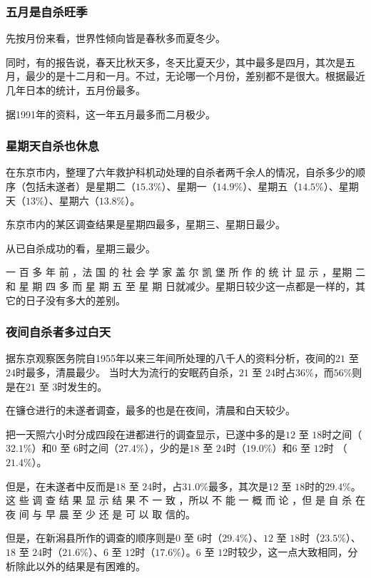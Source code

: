 \documentclass[UTF8]{ctexart}
\begin{document}
\subsubsection*{五月是自杀旺季}

先按月份来看，世界性倾向皆是春秋多而夏冬少。

同时，有的报告说，春天比秋天多，冬天比夏天少，其中最多是四月，其次是五月，最少的是十二月和一月。不过，无论哪一个月份，差别都不是很大。根据最近几年日本的统计，五月份最多。

据1991年的资料，这一年五月最多而二月极少。

\subsubsection*{星期天自杀也休息}

在东京市内，整理了六年救护科机动处理的自杀者两千余人的情况，自杀多少的顺序（包括未遂者）是星期二（$15.3\%$）、星期一（$14.9\%$）、星期五（$14.5\%$）、星期天（$13\%$）、星期六（$13.8\%$）。

东京市内的某区调查结果是星期四最多，星期三、星期日最少。

从已自杀成功的看，星期三最少。

一 百 多 年 前 ，法 国 的 社 会 学 家 盖 尔 凯 堡 所 作 的 统 计 显 示 ，星期 二 和 星 期 四 多 而 星 期 五 至 星 期 日就减少。星期日较少这一点都是一样的，其它的日子没有多大的差别。

\subsubsection*{夜间自杀者多过白天}

据东京观察医务院自1955年以来三年间所处理的八千人的资料分析，夜间的$21$ 至 $24$时最多，清晨最少。
当时大为流行的安眠药自杀，$21$ 至 $24$时占$36\%$，而$56\%$则是在$21$ 至 $3$时发生的。

在镰仓进行的未遂者调查，最多的也是在夜间，清晨和白天较少。

把一天照六小时分成四段在进都进行的调查显示，已遂中多的是$12$ 至 $18$时之间（$32.1\%$）和$0$ 至 $6$时之间（$27.4\%$），少的是$18$ 至 $24$时（$19.0\%$）和$6$ 至 $12$时 （$21.4\%$）。

但是，在未遂者中反而是$18$ 至 $24$时，占$31.0\%$最多，其次是$12$ 至 $18$时的$29.4\%$。 这 些 调 查 结 果 显 示 结 果 不 一 致 ，所以 不 能 一 概 而 论 ，但 是 自 杀 在 夜 间 与 早 晨 至 少 还 是 可 以 取 信的。

但是，在新潟县所作的调查的顺序则是$0$ 至 $6$时（$29.4\%$）、$12$ 至 $18$时（$23.5\%$）、$18$ 至 $24$时（$21.6\%$）、$6$ 至 $12$时（$17.6\%$）。$6$ 至 $12$时较少，这一点大致相同，分析除此以外的结果是有困难的。
\end{document}

